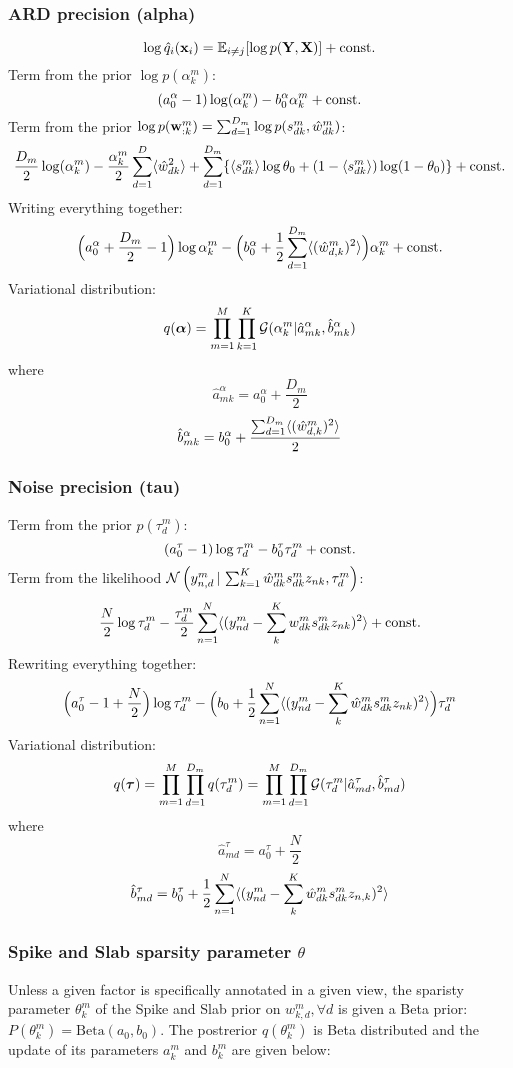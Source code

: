 \documentclass[10pt, a4paper,openany]{report}
\begin{document}
\subsubsection*{ARD precision (alpha)}
\begin{equation} \label{eq:optimal_q_dist}
\log \hat{q}_i({\bf x}_i) = \mathbb{E}_{i \neq j} [\log p({\bf Y},{\bf X})] + {\rm const.}
\end{equation}
Term from the prior $\log p(\alpha_k^m)$:
\[
(a_0^\alpha-1) \log(\alpha_k^m) - b_0^{\alpha}\alpha_k^m + {\rm const.}
\]
Term from the prior $\log p({\bf w}_{:k}^m) = \sum_{d=1}^{D_m} \log p(s_{dk}^m,\hat{w}_{dk}^m)$:
\[
\frac{D_m}{2}\log(\alpha_k^m) -\frac{\alpha_k^m}{2}\sum_{d=1}^{D} \langle \hat{w}_{dk}^2 \rangle + \sum_{d=1}^{D_m} \{ \langle s_{dk}^m \rangle \log\theta_0 + (1-\langle s_{dk}^m \rangle) \log(1-\theta_0)  \} + {\rm const.}
\]
Writing everything together:
\[
\Big(a_0^{\alpha} + \frac{D_m}{2} - 1 \Big)\log\alpha_k^m - \Big(b_0^{\alpha} + \frac{1}{2} \sum_{d=1}^{D_m}\langle (\hat{w}_{d,k}^m)^2 \rangle \Big) \alpha_k^m + {\rm const.}
\]
Variational distribution:
\[
q(\mbox{\boldmath $\alpha$}) = \prod_{m=1}^{M} \prod_{k=1}^{K} \mathcal{G}(\alpha_k^m | \hat{a}_{mk}^{\alpha}, \hat{b}_{mk}^{\alpha})
\]
where
\[
\hat{a}_{mk}^\alpha = a_0^\alpha + \frac{D_m}{2}
\]
\[
\hat{b}_{mk}^\alpha = b_0^\alpha +\frac{ \sum_{d=1}^{D_m} \langle (\hat{w}_{d,k}^m)^2 \rangle }{2}
\]

\subsubsection*{Noise precision (tau)}
Term from the prior $p(\tau_d^m)$:
\[
(a_0^\tau - 1) \log \tau_d^m - b_0^\tau \tau_d^m + {\rm const.}
\]
Term from the likelihood $\mathcal{N}\left(y_{n,d}^m \,|\, \sum_{k=1}^{K}\hat{w}_{dk}^m s_{dk}^m z_{nk},\tau_d^m\right)$:
\[
\frac{N}{2}\log \tau_d^m - \frac{\tau_d^m}{2} \sum_{n=1}^{N} \langle (y_{nd}^m - \sum_k^{K} w_{dk}^m s_{dk}^m z_{nk})^2 \rangle + {\rm const.}
\]
Rewriting everything together:
\[
\Big(a_0^\tau - 1 + \frac{N}{2} \Big)\log \tau_d^m - \Big( b_0 + \frac{1}{2} \sum_{n=1}^{N} \langle (y_{nd}^m - \sum_k^{K} \hat{w}_{dk}^m s_{dk}^m z_{nk})^2 \rangle  \Big )\tau_d^m
\]
Variational distribution:
\[
q(\mbox{\boldmath $\tau$}) = \prod_{m=1}^{M} \prod_{d=1}^{D_m} q(\tau_d^m) = \prod_{m=1}^{M} \prod_{d=1}^{D_m} \mathcal{G}(\tau_d^m|\hat{a}_{md}^{\tau},\hat{b}_{md}^{\tau})
\]
where
\[
\hat{a}_{md}^{\tau} = a_0^{\tau} + \frac{N}{2}
\]
\[
\hat{b}_{md}^{\tau} = b_0^{\tau} + \frac{1}{2} \sum_{n=1}^{N} \langle (y_{nd}^m - \sum_k^{K} \hat{w}_{dk}^m s_{dk}^m z_{n,k})^2 \rangle
\]

\subsubsection*{Spike and Slab sparsity parameter $\theta$}
Unless a given factor is specifically annotated in a given view, the sparisty parameter $\theta^m_{k}$ of the Spike and Slab prior on $w_{k,d}^m, \forall d$ is given a Beta prior: $P(\theta_k^m) = \mathrm{Beta} (a_0, b_0)$. The postrerior $q(\theta_k^m)$ is Beta distributed and the update of its parameters $a_k^m$ and $b_k^m$ are given below:\\
\end{document}
